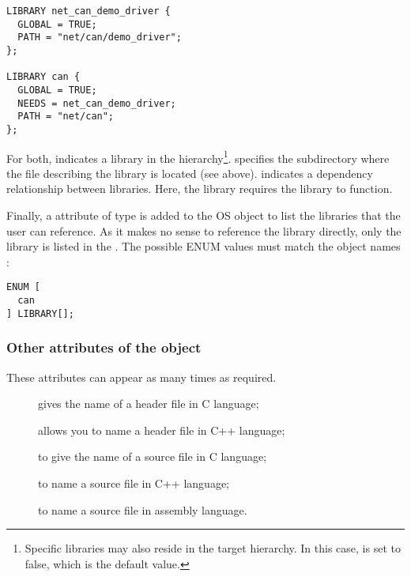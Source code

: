 \begin{lstlisting}[language=OIL]
LIBRARY net_can_demo_driver {
  GLOBAL = TRUE;
  PATH = "net/can/demo_driver";
};

LIBRARY can {
  GLOBAL = TRUE;
  NEEDS = net_can_demo_driver;
  PATH = "net/can";
};
\end{lstlisting} 

For both,  indicates a library in the  hierarchy\footnote{Specific libraries may also reside in the target hierarchy. In this case,  is set to false, which is the default value.}.  specifies the subdirectory where the  file describing the library is located (see above).  indicates a dependency relationship between libraries. Here, the  library requires the  library to function.

Finally, a  attribute of type  is added to the OS object to list the libraries that the user can reference. As it makes no sense to reference the  library directly, only the  library is listed in the . The possible ENUM values must match the object names :

\begin{lstlisting}[language=OIL]
ENUM [
  can
] LIBRARY[];
\end{lstlisting} 

\subsubsection{Other attributes of the  object}

These attributes can appear as many times as required.

\begin{description}
  \item[] gives the name of a header file in C language;
  \item[] allows you to name a header file in C++ language;
  \item[] to give the name of a source file in C language;
  \item[] to name a source file in C++ language;
  \item[]  to name a source file in assembly language.
 \end{description}

